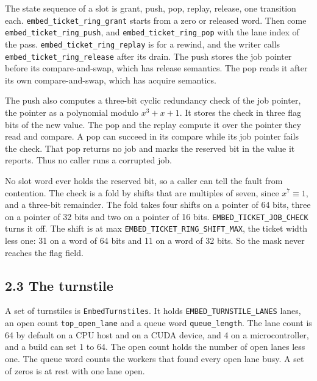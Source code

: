 The state sequence of a slot is grant, push, pop, replay, release, one transition each. \texttt{embed\_\allowbreak{}ticket\_\allowbreak{}ring\_\allowbreak{}grant} starts from a zero or released word. Then come \texttt{embed\_\allowbreak{}ticket\_\allowbreak{}ring\_\allowbreak{}push}, and \texttt{embed\_\allowbreak{}ticket\_\allowbreak{}ring\_\allowbreak{}pop} with the lane index of the pass. \texttt{embed\_\allowbreak{}ticket\_\allowbreak{}ring\_\allowbreak{}replay} is for a rewind, and the writer calls \texttt{embed\_\allowbreak{}ticket\_\allowbreak{}ring\_\allowbreak{}release} after its drain. The push stores the job pointer before its compare-and-swap, which has release semantics. The pop reads it after its own compare-and-swap, which has acquire semantics.

The push also computes a three-bit cyclic redundancy check of the job pointer, the pointer as a polynomial modulo \(x^{3} + x + 1\). It stores the check in three flag bits of the new value. The pop and the replay compute it over the pointer they read and compare. A pop can succeed in its compare while its job pointer fails the check. That pop returns no job and marks the reserved bit in the value it reports. Thus no caller runs a corrupted job.

No slot word ever holds the reserved bit, so a caller can tell the fault from contention. The check is a fold by shifts that are multiples of seven, since \(x^{7} \equiv 1\), and a three-bit remainder. The fold takes four shifts on a pointer of 64 bits, three on a pointer of 32 bits and two on a pointer of 16 bits. \texttt{EMBED\_\allowbreak{}TICKET\_\allowbreak{}JOB\_\allowbreak{}CHECK} turns it off. The shift is at max \texttt{EMBED\_\allowbreak{}TICKET\_\allowbreak{}RING\_\allowbreak{}SHIFT\_\allowbreak{}MAX}, the ticket width less one: 31 on a word of 64 bits and 11 on a word of 32 bits. So the mask never reaches the flag field.

\subsection{\texorpdfstring{2.3 The turnstile}{2.3 The turnstile}}

A set of turnstiles is \texttt{Embed\allowbreak{}Turnstiles}. It holds \texttt{EMBED\_\allowbreak{}TURNSTILE\_\allowbreak{}LANES} lanes, an open count \texttt{top\_\allowbreak{}open\_\allowbreak{}lane} and a queue word \texttt{queue\_\allowbreak{}length}. The lane count is 64 by default on a CPU host and on a CUDA device, and 4 on a microcontroller, and a build can set 1 to 64. The open count holds the number of open lanes less one. The queue word counts the workers that found every open lane busy. A set of zeros is at rest with one lane open.

